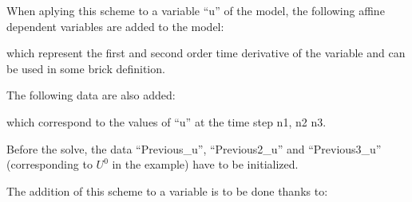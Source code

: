 \documentclass[a4paper,11pt,english]{sphinxmanual}
\begin{document}
\begin{sphinxVerbatim}[commandchars=\\\{\}]
   
  
\end{sphinxVerbatim}

When aplying this scheme to a variable “u” of the model, the following affine dependent variables are added to the model:

\begin{sphinxVerbatim}[commandchars=\\\{\}]
 
\end{sphinxVerbatim}

which represent the first and second order time derivative of the variable and can be used in some brick definition.

The following data are also added:

\begin{sphinxVerbatim}[commandchars=\\\{\}]
  
\end{sphinxVerbatim}

which correspond to the values of “u” at the time step n\sphinxhyphen{}1, n\sphinxhyphen{}2 n\sphinxhyphen{}3.

Before the solve, the data “Previous\_u”, “Previous2\_u” and “Previous3\_u” (corresponding to \(U^0\) in the example) have to be initialized.

The addition of this scheme to a variable is to be done thanks to:
\end{document}
